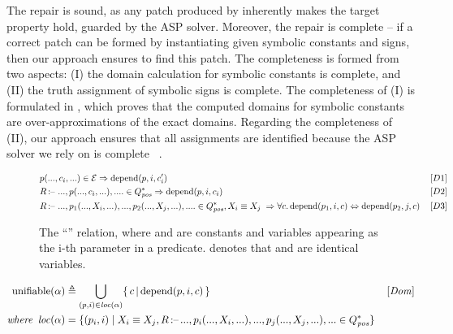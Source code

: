 \documentclass[acmsmall,screen,review,anonymous,nonacm]{acmart}
\begin{document}
The repair is sound, as any patch produced by \toolName inherently makes the target property hold, guarded by the ASP solver.  
Moreover, the repair is complete -- if a correct patch can be formed by instantiating given symbolic constants and signs, then our approach ensures to find this patch. 
The completeness is formed from two aspects: (I) the domain calculation for symbolic constants is complete, and (II) the truth assignment of symbolic signs is complete. 
The completeness of (I) is formulated in , which proves that the computed domains for symbolic constants are over-approximations of the exact domains. 
Regarding the completeness of (II), our approach ensures that all assignments are identified because the ASP solver we rely on is complete ~\cite{gebser2014clingo}.

\begin{figure}[!h]
  
  \begin{alignat*}{2}
    &p(..., c_i, ...) \in \mathcal{E} \Rightarrow \mathrm{depend}(p, i, c_i^\prime)  
    &&\, [D1]\\
    &R \,\text{:--}\, \,..., p(..., c_i, ...), .... \in Q^{*}_{\mathit{pos}} \Rightarrow \mathrm{depend}(p, i, c_i) 
    &&\, [D2]\\
    &R \,\text{:--}\,\,..., p_1(..., X_i, ...), ..., p_2(..., X_j, ...), .... \in Q^{*}_{\mathit{pos}}, X_i \equiv X_j 
    \; \Rightarrow \forall c.\,\mathrm{depend}(p_1, i, c) \Leftrightarrow \mathrm{depend}(p_2, j, c) 
    &&\, [D3]
\end{alignat*}
  
  \caption{The  ``'' relation, where 
   and  are constants and variables appearing as the i-th parameter in a predicate.  denotes that  and  are identical variables. 
  \label{fig:depend}}
\end{figure}

 
\begin{alignat*}{2}
 \mathrm{unifiable}(\alpha) & \triangleq  \bigcup_{(p, i)\in \mathit{loc}(\alpha)} \{\,c\,|\,\mathrm{depend}(p, i, c)\,\}  
 &&\, \mathit{[Dom]} \\
\mathit{where }\ \,  \mathit{loc}(\alpha) & = \{(p_i,  i) \mid X_i \equiv X_{j}, 
R \,\text{:--}\,  ..., p_i(..., X_i, ...), ..., 
p_j(..., X_{j}, ...),... \in Q^{*}_{\mathit{pos}} \}
\end{alignat*}
\end{document}
